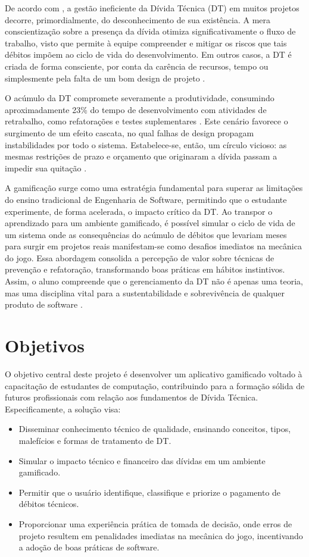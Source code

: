 \documentclass[12pt,openright,oneside,a4paper,brazil]{abntex2}
\begin{document}
De acordo com \cite{MELO2022111483}, a gestão ineficiente da Dívida Técnica (DT) em muitos projetos decorre, primordialmente, do desconhecimento de sua existência. A mera conscientização sobre a presença da dívida otimiza significativamente o fluxo de trabalho, visto que permite à equipe compreender e mitigar os riscos que tais débitos impõem ao ciclo de vida do desenvolvimento. Em outros casos, a DT é criada de forma consciente, por conta da carência de recursos, tempo ou simplesmente pela falta de um bom design de projeto \cite{BIAZOTTO2024107375}.

O acúmulo da DT compromete severamente a produtividade, consumindo aproximadamente 23\% do tempo de desenvolvimento com atividades de retrabalho, como refatorações e testes suplementares \cite{BESKER201941}. Este cenário favorece o surgimento de um efeito cascata, no qual falhas de design propagam instabilidades por todo o sistema. Estabelece-se, então, um círculo vicioso: as mesmas restrições de prazo e orçamento que originaram a dívida passam a impedir sua quitação \cite{BIAZOTTO2024107375}.

A gamificação surge como uma estratégia fundamental para superar as limitações do ensino tradicional de Engenharia de Software, permitindo que o estudante experimente, de forma acelerada, o impacto crítico da DT. Ao transpor o aprendizado para um ambiente gamificado, é possível simular o ciclo de vida de um sistema onde as consequências do acúmulo de débitos que levariam meses para surgir em projetos reais manifestam-se como desafios imediatos na mecânica do jogo. Essa abordagem consolida a percepção de valor sobre técnicas de prevenção e refatoração, transformando boas práticas em hábitos instintivos. Assim, o aluno compreende que o gerenciamento da DT não é apenas uma teoria, mas uma disciplina vital para a sustentabilidade e sobrevivência de qualquer produto de software \cite{10.1145/3724389.3730780}.

\section{Objetivos}
O objetivo central deste projeto é desenvolver um aplicativo gamificado voltado à capacitação de estudantes de computação, contribuindo para a formação sólida de futuros profissionais com relação aos fundamentos de Dívida Técnica. Especificamente, a solução visa:
\begin{itemize}
    \item Disseminar conhecimento técnico de qualidade, ensinando conceitos, tipos, malefícios e formas de tratamento de DT.
    \item Simular o impacto técnico e financeiro das dívidas em um ambiente gamificado.
    \item Permitir que o usuário identifique, classifique e priorize o pagamento de débitos técnicos.
    \item Proporcionar uma experiência prática de tomada de decisão, onde erros de projeto resultem em penalidades imediatas na mecânica do jogo, incentivando a adoção de boas práticas de software.
\end{itemize}
\end{document}

